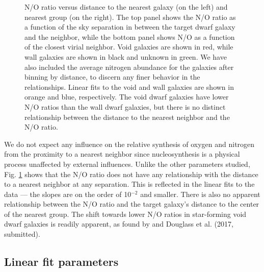 \begin{figure}
    \caption[N/O versus distance to nearest neighbor and group]{N/O ratio versus 
    distance to the nearest galaxy (on the left) and nearest group (on the 
    right).  The top panel shows the N/O ratio as a function of the sky 
    separation in \hMpc between the target dwarf galaxy and the neighbor, while 
    the bottom panel shows N/O as a function of the closest virial neighbor.  
    Void galaxies are shown in red, while wall galaxies are shown in black and 
    unknown in green.  We have also included the average nitrogen abundance for 
    the galaxies after binning by distance, to discern any finer behavior in the 
    relationships.  Linear fits to the void and wall galaxies are shown in 
    orange and blue, respectively.  The void dwarf galaxies have lower N/O 
    ratios than the wall dwarf galaxies, but there is no distinct relationship 
    between the distance to the nearest neighbor and the N/O ratio.  %
    }
    \label{fig:NO}
\end{figure}

We do not expect any influence on the relative synthesis of oxygen and nitrogen 
from the proximity to a nearest neighbor since nucleosynthesis is a physical 
process unaffected by external influences.  Unlike the other parameters studied, 
Fig. \ref{fig:NO} shows that the N/O ratio does not have any relationship with 
the distance to a nearest neighbor at any separation.  This is reflected in the 
linear fits to the data --- the slopes are on the order of 10$^{-2}$ and 
smaller.  %
There is also no apparent relationship between the N/O ratio and the target 
galaxy's distance to the center of the nearest group.  
The shift towards 
lower N/O ratios in star-forming void dwarf galaxies is readily apparent, as 
found by \cite{Douglass17b} and Douglass et al. (2017, submitted).


\subsection{Linear fit parameters}

